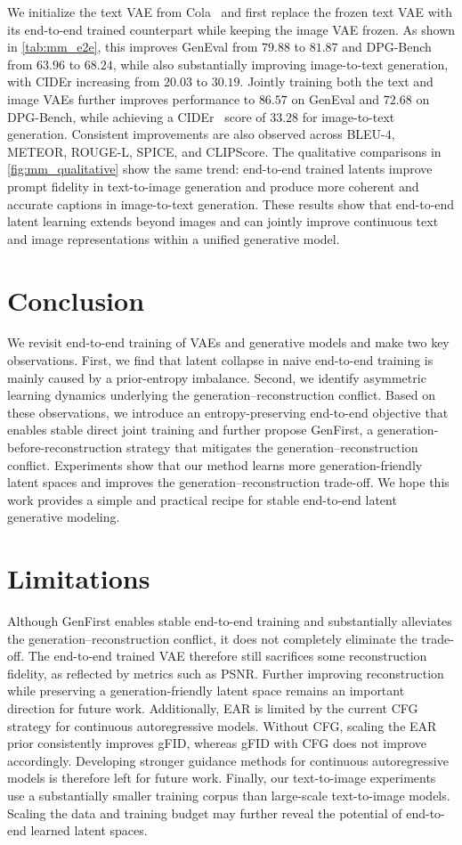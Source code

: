 \documentclass[]{bytedance_seed}
\begin{document}
We initialize the text VAE from Cola~\cite{cola} and first replace the frozen text VAE with its end-to-end trained counterpart while keeping the image VAE frozen.
As shown in \cref{tab:mm_e2e}, this improves GenEval from $79.88$ to $81.87$ and DPG-Bench from $63.96$ to $68.24$, while also substantially improving image-to-text generation, with CIDEr increasing from $20.03$ to $30.19$.
Jointly training both the text and image VAEs further improves performance to $86.57$ on GenEval and $72.68$ on DPG-Bench, while achieving a CIDEr~\cite{vedantam2015cider} score of $33.28$ for image-to-text generation.
Consistent improvements are also observed across BLEU-4, METEOR, ROUGE-L, SPICE, and CLIPScore.
The qualitative comparisons in \cref{fig:mm_qualitative} show the same trend: end-to-end trained latents improve prompt fidelity in text-to-image generation and produce more coherent and accurate captions in image-to-text generation.
These results show that end-to-end latent learning extends beyond images and can jointly improve continuous text and image representations within a unified generative model.

\section{Conclusion}
We revisit end-to-end training of VAEs and generative models and make two key
observations. First, we find that latent collapse in naive end-to-end training is
mainly caused by a prior-entropy imbalance. 
Second, we identify asymmetric learning dynamics underlying the generation--reconstruction conflict.
Based on these observations, we introduce an entropy-preserving end-to-end objective that enables stable direct joint training and further propose GenFirst, a generation-before-reconstruction strategy that mitigates the generation--reconstruction conflict.
Experiments show that our method learns more generation-friendly
latent spaces and improves the generation--reconstruction trade-off. We hope this
work provides a simple and practical recipe for stable end-to-end latent
generative modeling.

\section{Limitations}
Although GenFirst enables stable end-to-end training and substantially alleviates the generation--reconstruction conflict, it does not completely eliminate the trade-off.
The end-to-end trained VAE therefore still sacrifices some reconstruction fidelity, as reflected by metrics such as PSNR.
Further improving reconstruction while preserving a generation-friendly latent space remains an important direction for future work.
Additionally, EAR is limited by the current CFG strategy for continuous autoregressive models.
Without CFG, scaling the EAR prior consistently improves gFID, whereas gFID with CFG does not improve accordingly.
Developing stronger guidance methods for continuous autoregressive models is therefore left for future work.
Finally, our text-to-image experiments use a substantially smaller training corpus than large-scale text-to-image models.
Scaling the data and training budget may further reveal the potential of end-to-end learned latent spaces.
\end{document}

